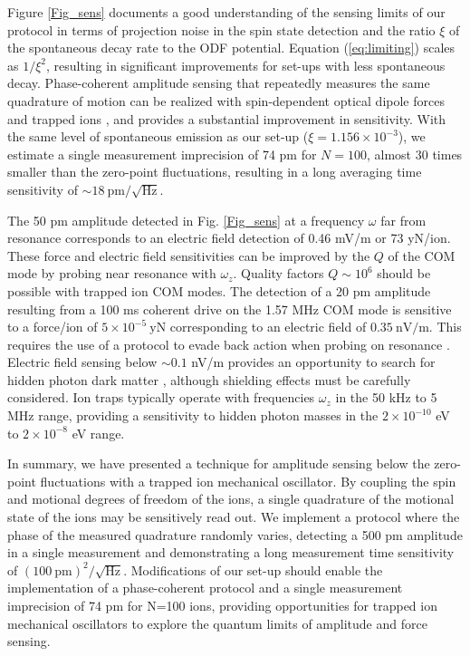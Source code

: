 \documentclass[aps,prl,twocolumn,superscriptaddress,floatfix,nofootinbib]{revtex4-1}
\begin{document}
Figure \ref{Fig_sens} documents a good understanding of the sensing limits
of our protocol in terms of projection noise in the spin state detection
and the ratio $\xi$ of the spontaneous decay rate to the ODF potential.
Equation (\ref{eq:limiting}) scales as $1/\xi^{2}$, resulting in
significant improvements for set-ups with less spontaneous decay.
Phase-coherent amplitude sensing that repeatedly measures the same quadrature of motion can be realized with spin-dependent optical dipole
forces and trapped ions \citep{Hume2011, Biercuk2011}, and provides a substantial improvement in sensitivity.
With the same level of spontaneous emission as our set-up ($\xi=1.156\times10^{-3}$), we estimate a single measurement imprecision of 74 pm for $N=100$, almost 30 times
smaller than the zero-point fluctuations, resulting in a long averaging time sensitivity of $\sim18\:\mathrm{pm/\sqrt{\mathrm{Hz}}}$. 

The 50 pm amplitude detected in Fig. \ref{Fig_sens} at a frequency $\omega$ far from resonance corresponds to an electric field detection of 0.46 mV/m or 73 yN/ion. These force and electric field sensitivities can be improved by the $Q$ of the COM mode by probing near resonance with $\omega_z$. Quality factors $Q\sim 10^6$ should be possible with trapped ion COM modes. The detection of a 20 pm amplitude resulting from a 100 ms coherent drive on the 1.57 MHz COM mode is sensitive to a force/ion of $5\times10^{-5}\:\mathrm{yN}$ corresponding to an electric field of $0.35\:\mathrm{nV/m}$. This requires
the use of a protocol to evade back action when probing on resonance \citep{Hempel2013}. Electric field sensing below $\sim 0.1$ nV/m provides an opportunity to search for hidden photon dark matter \citep{Arias2012,Chaudhuri2015}, although shielding effects must be carefully considered. Ion traps typically operate with frequencies $\omega_z$ in the 50 kHz to 5 MHz range, providing a sensitivity to hidden photon masses in the $2 \times 10^{-10}$ eV to $2 \times 10^{-8}$ eV range.

In summary, we have presented a technique for amplitude sensing below the zero-point fluctuations with a trapped ion mechanical oscillator. By coupling
the spin and motional degrees of freedom of the ions, a single quadrature of the motional state of the ions may be sensitively read out. We implement a 
protocol where the phase of the measured quadrature randomly varies, detecting a 500 pm amplitude in a single measurement
and demonstrating a long measurement time sensitivity of $\left(100\:\mathrm{pm}\right)^{2}/\sqrt{\mathrm{Hz}}$. Modifications of our set-up should enable the implementation of a phase-coherent protocol and a single measurement
imprecision of 74 pm for N=100 ions, providing opportunities for
trapped ion mechanical oscillators to explore the quantum limits of amplitude and force sensing.
\end{document}
